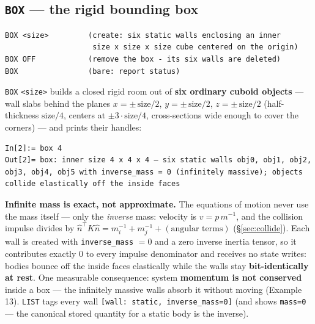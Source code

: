 \documentclass[11pt]{article}
\newcommand{\kw}[1]{\texttt{\uppercase{#1}}}
\newcommand{\code}[1]{\texttt{#1}}
\begin{document}
\subsection{\kw{box} --- the rigid bounding box}
\label{sec:box}

\begin{lstlisting}
BOX <size>         (create: six static walls enclosing an inner
                    size x size x size cube centered on the origin)
BOX OFF            (remove the box - its six walls are deleted)
BOX                (bare: report status)
\end{lstlisting}

\kw{box} \code{<size>} builds a closed rigid room out of \textbf{six
ordinary cuboid objects} --- wall slabs behind the planes
$x = \pm\,\mathrm{size}/2$, $y = \pm\,\mathrm{size}/2$,
$z = \pm\,\mathrm{size}/2$ (half-thickness $\mathrm{size}/4$, centers
at $\pm 3\cdot\mathrm{size}/4$, cross-sections wide enough to cover
the corners) --- and prints their handles:

\begin{lstlisting}
In[2]:= box 4
Out[2]= box: inner size 4 x 4 x 4 — six static walls obj0, obj1, obj2, obj3, obj4, obj5 with inverse_mass = 0 (infinitely massive); objects collide elastically off the inside faces
\end{lstlisting}

\textbf{Infinite mass is exact, not approximate.} The equations of
motion never use the mass itself --- only the \emph{inverse} mass:
velocity is $v = p\,m^{-1}$, and the collision impulse divides by
$\hat n^{\!\top}K\hat n = m_i^{-1} + m_j^{-1} + (\text{angular terms})$
(\S\ref{sec:collide}). Each wall is created with
\code{inverse\_mass} $= 0$ and a zero inverse inertia tensor, so it
contributes exactly 0 to every impulse denominator and receives no
state writes: bodies bounce off the inside faces elastically while the
walls stay \textbf{bit-identically at rest}. One measurable
consequence: system \textbf{momentum is not conserved} inside a box
--- the infinitely massive walls absorb it without moving
(Example 13). \kw{list} tags every wall
\code{[wall: static, inverse\_mass=0]} (and shows \code{mass=0} ---
the canonical stored quantity for a static body is the inverse).
\end{document}
